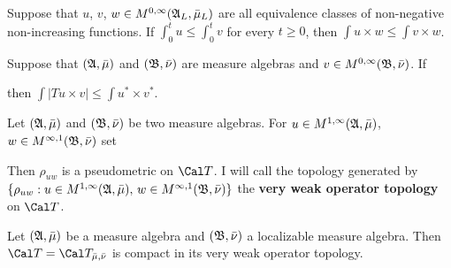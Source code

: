  Suppose that $u$, $v$, 
$w\in M^{0,\infty}(\frak A_L,\bar\mu_L)$
are all equivalence classes of non-negative
non-increasing functions.   If
$\int_0^tu\le\int_0^tv$ for every $t\ge 0$, then 
$\int u\times w\le\int v\times w$.
     
     
 Suppose that $(\frak A,\bar\mu)$ and 
$(\frak B,\bar\nu)$ are measure algebras and 
$v\in M^{0,\infty}(\frak B,\bar\nu)$.   If
     
     
     
\noindent then $\int|Tu\times v|\le\int u^*\times v^*$.
     
     
 Let 
$(\frak A,\bar\mu)$ and $(\frak B,\bar\nu)$ be two measure algebras.      For $u\in M^{1,\infty}(\frak A,\bar\mu)$, 
$w\in M^{\infty,1}(\frak B,\bar\nu)$ set
     
     
\noindent Then $\rho_{uw}$ is a pseudometric on $\Cal T$.   I will call
the topology generated by 
$\{\rho_{uw}:u\in M^{1,\infty}(\frak A,\bar\mu),\,
w\in M^{\infty,1}(\frak B,\bar\nu)\}$ the
{\bf very weak operator topology} on $\Cal T$.
     
 Let $(\frak A,\bar\mu)$ be a measure algebra and
$(\frak B,\bar\nu)$ a localizable measure algebra.   Then 
$\Cal T=\Cal T_{\bar\mu,\bar\nu}$ is compact in its very weak operator topology.
     
